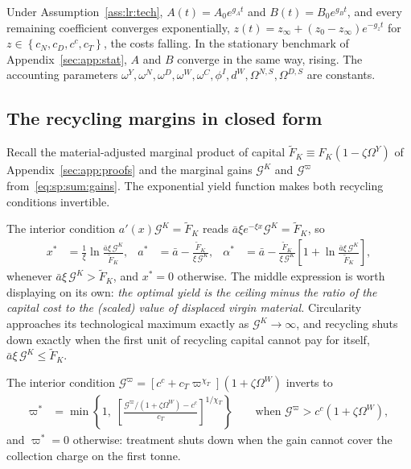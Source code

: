  Under Assumption~\ref{ass:lr:tech}, $A(t)=A_0e^{g_At}$ and $B(t)=B_0e^{g_Bt}$, and every remaining coefficient converges exponentially, $z(t)=z_\infty+\left(z_0-z_\infty\right)e^{-g_z t}$ for $z\in\left\{c_N,c_D,c^c,c_T\right\}$, the costs falling. In the stationary benchmark of Appendix~\ref{sec:app:stat}, $A$ and $B$ converge in the same way, rising. The accounting parameters $\omega^Y,\omega^N,\omega^D,\omega^W,\omega^C,\phi^I,d^W,\Omega^{N,S},\Omega^{D,S}$ are constants.

\subsection{The recycling margins in closed form}\label{sec:app:workhorse:margins}

Recall the material-adjusted marginal product of capital $\tilde F_K\equiv F_K\left(1-\zeta\Omega^Y\right)$ of Appendix~\ref{sec:app:proofs} and the marginal gains $\mathcal G^K$ and $\mathcal G^\varpi$ from~\eqref{eq:sp:sum:gains}. The exponential yield function makes both recycling conditions invertible.

 The interior condition $a'\left(x\right)\mathcal G^K=\tilde F_K$ reads $\bar a\xi e^{-\xi x}\mathcal G^K=\tilde F_K$, so
\begin{align}
x^* &= \frac{1}{\xi}\ln\frac{\bar a\xi\,\mathcal G^K}{\tilde F_K},
&
a^* &= \bar a-\frac{\tilde F_K}{\xi\,\mathcal G^K},
&
\alpha^* &= \bar a-\frac{\tilde F_K}{\xi\,\mathcal G^K}\left[1+\ln\frac{\bar a\xi\,\mathcal G^K}{\tilde F_K}\right],
\label{eq:app:wh:xstar}
\end{align}
whenever $\bar a\xi\,\mathcal G^K>\tilde F_K$, and $x^*=0$ otherwise. The middle expression is worth displaying on its own: \emph{the optimal yield is the ceiling minus the ratio of the capital cost to the (scaled) value of displaced virgin material.} Circularity approaches its technological maximum exactly as $\mathcal G^K\to\infty$, and recycling shuts down exactly when the first unit of recycling capital cannot pay for itself, $\bar a\xi\,\mathcal G^K\le\tilde F_K$.

 The interior condition $\mathcal G^\varpi=\left[c^c+c_T\varpi^{\chi_T}\right]\left(1+\zeta\Omega^W\right)$ inverts to
\begin{align}
\varpi^* &= \min\left\{1,\;\left[\frac{\mathcal G^\varpi/\left(1+\zeta\Omega^W\right)-c^c}{c_T}\right]^{1/\chi_T}\right\}
\qquad\text{when }\mathcal G^\varpi>c^c\left(1+\zeta\Omega^W\right),
\label{eq:app:wh:varpistar}
\end{align}
and $\varpi^*=0$ otherwise: treatment shuts down when the gain cannot cover the collection charge on the first tonne.

